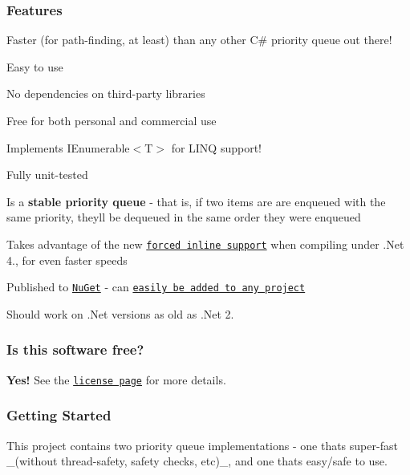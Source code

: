 \subsubsection*{Features}


\begin{DoxyItemize}
\item Faster (for path-\/finding, at least) than any other C\# priority queue out there!
\item Easy to use
\item No dependencies on third-\/party libraries
\item Free for both personal and commercial use
\item Implements {\ttfamily I\+Enumerable$<$T$>$} for L\+I\+NQ support!
\item Fully unit-\/tested
\item Is a {\bfseries stable priority queue} -\/ that is, if two items are are enqueued with the same priority, they\textquotesingle{}ll be dequeued in the same order they were enqueued
\item Takes advantage of the new \href{http://msdn.microsoft.com/en-us/library/system.runtime.compilerservices.methodimploptions%28v=vs.110%29.aspx}{\tt forced inline support} when compiling under .Net 4.\+5, for even faster speeds
\item Published to \href{https://www.nuget.org/packages/OptimizedPriorityQueue/}{\tt Nu\+Get} -\/ can \href{https://github.com/BlueRaja/High-Speed-Priority-Queue-for-C-Sharp/wiki/Getting-Started}{\tt easily be added to any project}
\item Should work on .Net versions as old as .Net 2.
\end{DoxyItemize}

\subsubsection*{Is this software free?}

{\bfseries Yes!} See the \href{https://github.com/BlueRaja/High-Speed-Priority-Queue-for-C-Sharp/wiki/License}{\tt license page} for more details.

\subsubsection*{Getting Started}

This project contains two priority queue implementations -\/ one that\textquotesingle{}s super-\/fast \+\_\+(without thread-\/safety, safety checks, etc)\+\_\+, and one that\textquotesingle{}s easy/safe to use.

